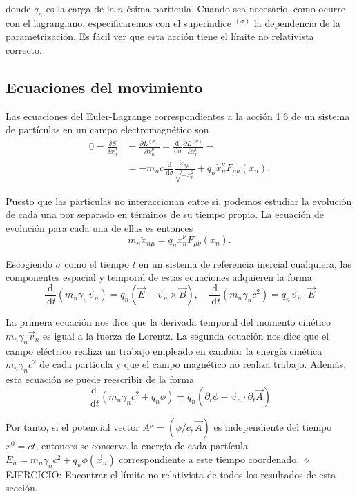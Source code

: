 donde $q_{n}$ es la carga de la $n$-ésima partícula. Cuando sea necesario, como ocurre con el lagrangiano, especificaremos con el superíndice ${ }^{(\sigma)}$ la dependencia de la parametrización. Es fácil ver que esta acción tiene el límite no relativista correcto.
\subsection{Ecuaciones del movimiento}
Las ecuaciones del Euler-Lagrange correspondientes a la acción 1.6 de un sistema de partículas en un campo electromagnético son 
$$
\begin{aligned}
0=\frac{\delta S}{\delta x_{n}^{\mu}} & =\frac{\partial L^{(\sigma)}}{\partial x_{n}^{\mu}}-\frac{\mathrm{d}}{\mathrm{~d} \sigma} \frac{\partial L^{(\sigma)}}{\partial \dot{x}_{n}^{\mu}}= \\
& =-m_{n} c \frac{\mathrm{~d}}{\mathrm{~d} \sigma} \frac{\dot{x}_{n \mu}}{\sqrt{-\dot{x}_{n}^{2}}}+q_{n} \dot{x}_{n}^{\nu} F_{\mu \nu}\left(x_{n}\right) .
\end{aligned}
$$

Puesto que las partículas no interaccionan entre sí, podemos estudiar la evolución de cada una por separado en términos de su tiempo propio. La ecuación de evolución para cada una de ellas es entonces
$$
m_{n} \ddot{x}_{n \mu}=q_{n} \dot{x}_{n}^{\nu} F_{\mu \nu}\left(x_{n}\right) .
$$

Escogiendo $\sigma$ como el tiempo $t$ en un sistema de referencia inercial cualquiera, las componentes espacial y temporal de estas ecuaciones adquieren la forma 
$$
\frac{\mathrm{d}}{\mathrm{~d} t}\left(m_{n} \gamma_{n} \vec{v}_{n}\right)=q_{n}\left(\vec{E}+\vec{v}_{n} \times \vec{B}\right), \quad \frac{\mathrm{d}}{\mathrm{~d} t}\left(m_{n} \gamma_{n} c^{2}\right)=q_{n} \vec{v}_{n} \cdot \vec{E}
$$

La primera ecuación nos dice que la derivada temporal del momento cinético $m_{n} \gamma_{n} \vec{v}_{n}$ es igual a la fuerza de Lorentz. La segunda ecuación nos dice que el campo eléctrico realiza un trabajo empleado en cambiar la energía cinética $m_{n} \gamma_{n} c^{2}$ de cada partícula y que el campo magnético no realiza trabajo. Además, esta ecuación se puede reescribir de la forma 
$$
\frac{\mathrm{d}}{\mathrm{~d} t}\left(m_{n} \gamma_{n} c^{2}+q_{n} \phi\right)=q_{n}\left(\partial_{t} \phi-\vec{v}_{n} \cdot \partial_{t} \vec{A}\right)
$$

Por tanto, si el potencial vector $A^{\mu}=(\phi / c, \vec{A})$ es independiente del tiempo $x^{0}=c t$, entonces se conserva la energía de cada partícula $E_{n}=m_{n} \gamma_{n} c^{2}+q_{n} \phi\left(\vec{x}_{n}\right)$ correspondiente a este tiempo coordenado.
$\diamond$ EJERCICIO: Encontrar el límite no relativista de todos los resultados de esta sección.
